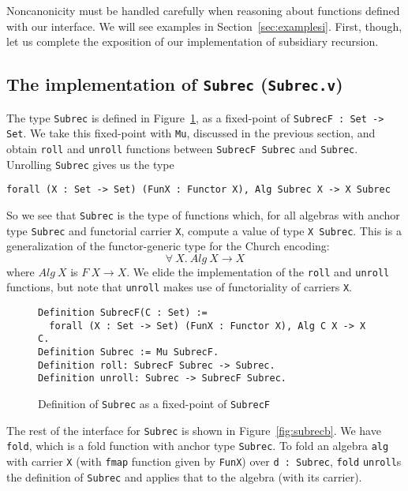 \documentclass[a4paper,USenglish]{lipics-v2021}
\begin{document}
Noncanonicity must be handled carefully when reasoning about functions
defined with our interface.  We will see examples in
Section~\ref{sec:examplesi}.  First, though, let us complete the
exposition of our implementation of subsidiary recursion.

\subsection{The implementation of \texttt{Subrec} (\texttt{Subrec.v})}

The type \verb|Subrec| is defined in Figure~\ref{fig:subrec}, as a
fixed-point of \verb|SubrecF : Set -> Set|.  We take this fixed-point
with \verb|Mu|, discussed in the previous section, and obtain \verb|roll|
and \verb|unroll| functions between \verb|SubrecF Subrec| and \verb|Subrec|.
Unrolling \verb|Subrec| gives us the type
\begin{verbatim}
forall (X : Set -> Set) (FunX : Functor X), Alg Subrec X -> X Subrec
\end{verbatim}
\noindent So we see that \verb|Subrec| is the type of functions which,
for all algebras with anchor type \verb|Subrec| and functorial carrier
\verb|X|, compute a value of type \verb|X Subrec|.  This is a generalization
of the functor-generic type for the Church encoding:
\[
\forall\ X.\ \textit{Alg}\ X \to X
\]
\noindent where $\textit{Alg}\ X$ is $F\ X \to X$.  
We elide the implementation of the \verb|roll| and \verb|unroll| functions, but
note that \verb|unroll| makes use of functoriality of carriers \verb|X|.

\begin{figure}
\begin{verbatim}
Definition SubrecF(C : Set) := 
  forall (X : Set -> Set) (FunX : Functor X), Alg C X -> X C.
Definition Subrec := Mu SubrecF.
Definition roll: SubrecF Subrec -> Subrec.
Definition unroll: Subrec -> SubrecF Subrec.
\end{verbatim}
\caption{Definition of \texttt{Subrec} as a fixed-point of \texttt{SubrecF}}
\label{fig:subrec}
\end{figure}

The rest of the interface for \verb|Subrec| is shown in
Figure~\ref{fig:subrecb}.  We have \verb|fold|, which is a fold
function with anchor type \verb|Subrec|.  To fold an algebra
\verb|alg| with carrier \verb|X| (with \verb|fmap| function given by
\verb|FunX|) over \verb|d : Subrec|, \verb|fold| \verb|unroll|s the
definition of \verb|Subrec| and applies that to the algebra (with its
carrier).
\end{document}
